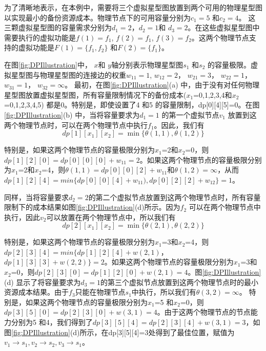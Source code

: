 为了清晰地表示，在本例中，需要将三个虚拟星型图放置到两个可用的物理星型图以实现最小的备份资源成本。物理节点下的可用容量分别为$c_1=5$ 和$c_2=4$。 这三颗虚拟星型图的容量需求分别为$d_1=2$，$d_2=1$和 $d_3=2$。在这些虚拟星型图中需要执行的虚拟功能是$f(1)=f_1$, $f(2)=f_1$, $f(3)=f_2$。这两个物理节点支持的虚拟功能是$F(1)=\{f_1,f_2\}$ 和$F(2)=\{f_1\}$。

在图\ref{fig:DPIllustration}中， $x$和 $y$轴分别表示物理星型图$s_1$ 和$s_2$ 的容量极限。虚拟星型图与物理星型图的连接边的权重$w_{11}=1$, $w_{12}=2$， $w_{21}=3$， $w_{22}=1$， $w_{31}=1$， $w_{32}=\infty$。 最初，在图\ref{fig:DPIllustration}(a) 中，由于没有对任何物理星型图放置虚拟星型图，所有容量限制情况下的备份成本($x_1$=0,1,2,3,4和$x_2$=0,1,2,3,4,5) 都是0。特别是，即使设置了4 和5 的容量限制，dp[0][4][5]=0。在图\ref{fig:DPIllustration}(b) 中，当将容量要求为$d_1=1$ 的第一个虚拟节点$v_1$ 放置到这两个物理节点时，可以在两个物理节点中执行$f_1$。因此，我们有
\begin{equation}
dp[1][{x_1}][{x_2}] = \min \{\theta (1,1),\theta (1,2)\}
\end{equation}

特别是，如果这两个物理节点的容量极限分别为$x_1$=2和$x_2$=0，则$dp[1][2][0]= dp[0][0][0]+w_{11}=2$。如果这两个物理节点的容量极限分别为$x_1$=2和$x_2$=4，则$\theta (1,1)=dp[0][0][2]+w_{11}$和$\theta (1,2)=\infty$，从而$dp[1][2][4]=min\{ dp[0][0][4]+w_{11}), dp[0][2][2]+w_{12} \}=1$。

同样，当将容量要求$d_2=2$的第二个虚拟节点放置到这两个物理节点时，所有容量限制下的成本结果如图\ref{fig:DPIllustration}(d)所示。因为$f_2$ 可以在两个物理节点中执行，因此$v_2$可以放置在两个物理节点中，所以我们有
\begin{equation}
dp[2][{x_1}][{x_2}] = \min \{\theta (2,1),\theta (2,2)\}
\end{equation}


特别是，如果这两个物理节点的容量极限分别为$x_1$=3和$x_2$=4，则$dp[2][3][4]=min\{dp[1][2][4]+w(2,1)$，$dp[1][3][3]+w(2,2)\}=2$。如果这两个物理节点的容量极限分别为$x_1$=3和$x_2$=0，则$dp[2][3][0]=dp[1][2][0]+w(2,1)=4$。图\ref{fig:DPIllustration}(d) 显示了将容量要求为$d_3=1$的第三个虚拟节点放置到这两个物理节点时的最小资源成本结果。由于$f_3$只能在物理节点$s_1$中执行，所以我们有$\theta (3,2)=\infty$。 特别是，如果这两个物理节点的容量极限分别为$x_1$=5 和$x_2$=0，则$dp[3][5][0]=dp[2][3][0]+w(3,1)=4$。由于这两个物理节点的节点能力分别为5 和4，我们得到了$dp[3][5][4]=dp[2][3][4]+w(3,1)=3$，如图\ref{fig:DPIllustration}(d)所示，在dp[3][5][4]=3处得到了最佳位置，赋值为$v_1\rightarrow s_1, v_2\rightarrow s_2, v_3\rightarrow s_1$。

